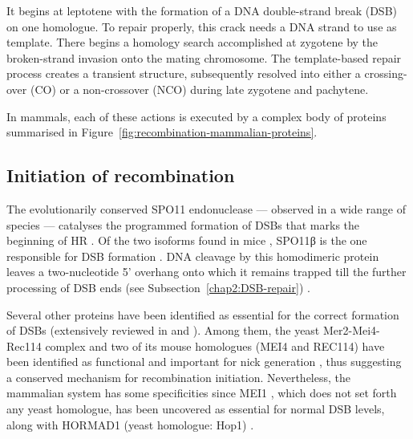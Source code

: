 It begins at leptotene with the formation of a DNA double-strand break (DSB) on one homologue. 
To repair properly, this crack needs a DNA strand to use as template. There begins a homology search accomplished at zygotene by the broken-strand invasion onto the mating chromosome.
The template-based repair process creates a transient structure, subsequently resolved into either a crossing-over (CO) or a non-crossover (NCO) during late zygotene and pachytene.

In mammals, each of these actions is executed by a complex body of proteins summarised in Figure~\ref{fig:recombination-mammalian-proteins}. 



\subsection{Initiation of recombination}

The evolutionarily conserved SPO11 endonuclease — observed in a wide range of species \citep{baudat2000chromosome,mckim1998meiw68,romanienko2000mouse,steiner2002meiotic,bowring2006chromosome,stacey2006arabidopsis} — catalyses the programmed formation of DSBs \citep{keeney1997meiosisspecific,bergerat1997atypical} that marks the beginning of HR \citep{sun1989double}.
Of the two isoforms found in mice \citep{metzler-guillemain2000identification}, SPO11\textgreek{β} is the one responsible for DSB formation \citep{bellani2010expression}.
DNA cleavage by this homodimeric protein leaves a two-nucleotide 5' overhang \citep{demassy1995nucleotidea}	onto which it remains trapped till the further processing of DSB ends (see Subsection~\ref{chap2:DSB-repair}) \citep[reviewed in][]{cole2010evolutionary}.

Several other proteins have been identified as essential for the correct formation of DSBs (extensively reviewed in \citealp{keeney2008spo11a} and \citealp{demassy2013initiation}).
Among them, the yeast Mer2-Mei4-Rec114 complex \citep{li2006saccharomyces,maleki2007interactions} and two of its mouse homologues (MEI4 and REC114) have been identified as functional and important for nick generation \citep{kumar2010functional,kumar2015mei4}, thus suggesting a conserved mechanism for recombination initiation. 
Nevertheless, the mammalian system has some specificities since MEI1 \citep{libby2002mouse,libby2003positional}, which does not set forth any yeast homologue, has been uncovered as essential for normal DSB levels, along with HORMAD1 (yeast homologue: Hop1) \citep{shin2010hormad1,daniel2011meiotic}.


